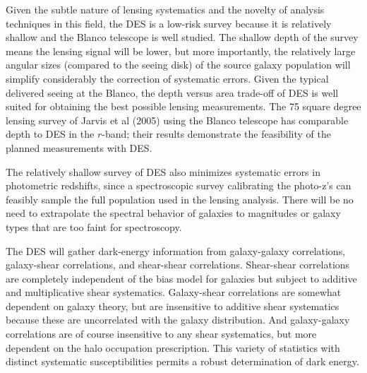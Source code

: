 \documentclass[preprint]{aastex}
\begin{document}
Given the subtle nature of lensing systematics and the novelty of
analysis techniques in this field, the DES is a low-risk survey
because it is relatively shallow and the Blanco telescope is well
studied. The shallow depth of the survey means the lensing signal
will be lower, but more importantly, the relatively large angular sizes
(compared to the seeing disk) of the
source galaxy population will simplify considerably the correction
of systematic errors. Given the typical delivered seeing at the
Blanco, the depth versus area trade-off of DES is well suited for
obtaining the best possible lensing measurements. The 75 square
degree lensing survey of Jarvis et al (2005) using the Blanco
telescope has comparable depth to DES in the $r$-band; their results
demonstrate the feasibility of the planned measurements with DES.

The relatively shallow survey of DES also minimizes systematic errors
in photometric redshifts, since a spectroscopic survey calibrating the
photo-z's can feasibly sample the full population used in the lensing
analysis. There will be no need to extrapolate the spectral behavior
of galaxies to magnitudes or galaxy types that are too faint for
spectroscopy. 

The DES will gather dark-energy information from galaxy-galaxy
correlations, galaxy-shear correlations, and shear-shear
correlations.  Shear-shear correlations are completely independent of
the bias model for galaxies but subject to additive and
multiplicative shear systematics.
Galaxy-shear correlations are somewhat dependent on galaxy theory, but
are insensitive to additive shear systematics because these are
uncorrelated with the galaxy distribution.  And galaxy-galaxy
correlations are of course insensitive to any shear systematics, but
more dependent on the halo occupation prescription.  This variety of
statistics with distinct systematic susceptibilities permits a robust
determination of dark energy.
\end{document}
